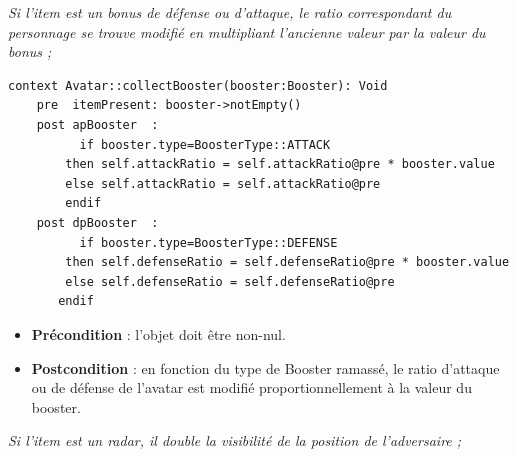 \documentclass[oneside,a4paper]{book}
\begin{document}
\begin{itemize}
\begin{minipage}{\linewidth}
    \item \textit{Si l'item est un bonus de défense ou d'attaque, le ratio correspondant du personnage se trouve modifié en multipliant l'ancienne valeur par la valeur du bonus ;}

\begin{minipage}{\linewidth}
    \begin{lstlisting}
context Avatar::collectBooster(booster:Booster): Void
    pre  itemPresent: booster->notEmpty()
    post apBooster  : 
          if booster.type=BoosterType::ATTACK
        then self.attackRatio = self.attackRatio@pre * booster.value
        else self.attackRatio = self.attackRatio@pre
        endif
    post dpBooster  : 
          if booster.type=BoosterType::DEFENSE
        then self.defenseRatio = self.defenseRatio@pre * booster.value
        else self.defenseRatio = self.defenseRatio@pre
       endif
    \end{lstlisting}
\end{minipage}

    \begin{itemize}
        \item \textbf{Précondition} : l'objet doit être non-nul.
        \item \textbf{Postcondition} : en fonction du type de Booster ramassé, le ratio d'attaque ou de défense de l'avatar est modifié proportionnellement à la valeur du booster.
    \end{itemize}
\end{minipage}

    \item \textit{Si l'item est un radar, il double la visibilité de la position de l'adversaire ;}
    

\end{itemize}
\end{document}
